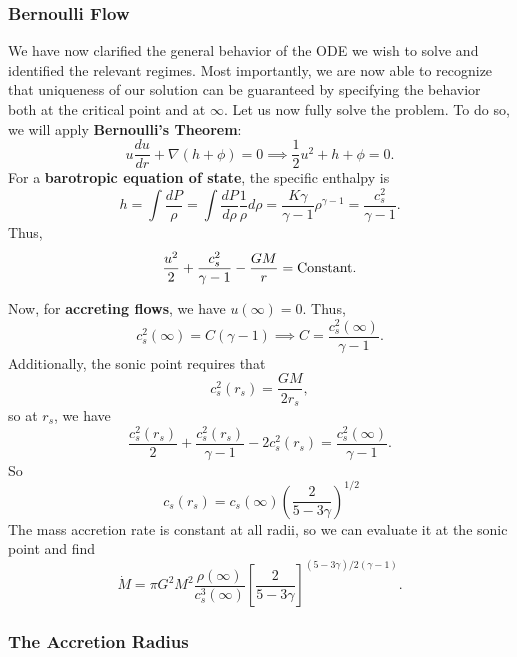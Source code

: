 \subsubsection{Bernoulli Flow}
We have now clarified the general behavior of the ODE we wish to solve and identified the relevant regimes. Most importantly, we are now able to recognize that uniqueness of our solution can be guaranteed by specifying the behavior both at the critical point and at $\infty$. Let us now fully solve the problem. To do so, we will apply \textbf{Bernoulli's Theorem}:
\[
u \frac{du}{dr}+ \nabla(h+\phi) = 0 \implies \frac{1}{2} u^2 + h + \phi = 0.
\]
For a \textbf{barotropic equation of state}, the specific enthalpy is
\[
h = \int \frac{dP}{\rho} = \int \frac{dP}{d\rho} \frac{1}{\rho} d\rho = \frac{K\gamma}{\gamma -1} \rho^{\gamma - 1} = \frac{c_s^2}{\gamma -1}.
\]
Thus,
\begin{equation}
    \frac{u^2}{2} + \frac{c_s^2}{\gamma -1} - \frac{GM}{r} = \rm{Constant}.
\end{equation}
\par
Now, for \textbf{accreting flows}, we have $u(\infty) = 0$. Thus,
\[
c_s^2(\infty) = C(\gamma-1) \implies C = \frac{c_s^2(\infty)}{\gamma -1}.
\]
Additionally, the sonic point requires that
\[
c_s^2(r_s) = \frac{GM}{2r_s},
\]
so at $r_s$, we have
\[
\frac{c_s^2(r_s)}{2} + \frac{c_s^2(r_s)}{\gamma -1} - 2c_s^2(r_s) = \frac{c_s^2(\infty)}{\gamma -1}.
\]
So
\begin{equation}
\boxed{\
    c_s(r_s) = c_s(\infty) \left(\frac{2}{5 - 3\gamma}\right)^{1/2}
    }
\end{equation}
The mass accretion rate is constant at all radii, so we can evaluate it at the sonic point and find
\begin{equation}
    \boxed{
    \dot{M} = \pi G^2 M^2 \frac{\rho(\infty)}{c_s^3(\infty)} \left[\frac{2}{5-3\gamma}\right]^{(5-3\gamma)/2(\gamma-1)}.
    }
\end{equation}
\subsubsection{The Accretion Radius}

